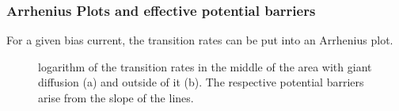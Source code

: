 \documentclass[12pt,a4paper]{article}
\begin{document}
\subsubsection{Arrhenius Plots and effective potential barriers}
For a given bias current, the transition rates can be put into an Arrhenius plot.
\begin{figure}[H]
	\hspace*{-0.5cm}
	\caption{logarithm of the transition rates in the middle of the area with giant diffusion (a) and outside of it (b). The respective potential barriers arise from the slope of the lines.}
	\label{arrhplots}
\end{figure}
\end{document}
